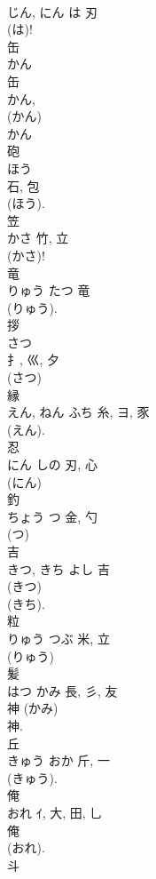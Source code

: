 \documentclass[8pt]{extreport}
\begin{document}
\begin{CJK}{UTF8}{min}
\\	じん, にん	は	刃	
\\	(は)!
\\	缶	
\\	かん	
\\	缶	
\\	かん, 
\\	(かん) 
\\	かん 
\\	砲	
\\	ほう	
\\	石, 包	
\\	(ほう). 
\\	笠	
\\	かさ	竹, 立	
\\	(かさ)!
\\	竜	
\\	りゅう	たつ	竜	
\\	(りゅう).	
\\	拶	
\\	さつ	
\\	扌, 巛, 夕	
\\	(さつ) 
\\	縁	
\\	えん, ねん	ふち	糸, ヨ, 豕	
\\	(えん).	
\\	忍	
\\	にん	しの	刃, 心	
\\	(にん) 
\\	釣	
\\	ちょう	つ	金, 勺	
\\	(つ) 
\\	吉	
\\	きつ, きち	よし	吉	
\\	(きつ) 
\\	(きち). 
\\	粒	
\\	りゅう	つぶ	米, 立	
\\	(りゅう) 
\\	髪	
\\	はつ	かみ	長, 彡, 友	
\\	神 (かみ) 
\\	神. 
\\	丘	
\\	きゅう	おか	斤, 一	
\\	(きゅう). 
\\	俺	
\\	おれ	ｲ, 大, 田, 乚	
\\	俺 
\\	(おれ).	
\\	斗	

\end{CJK}
\end{document}
